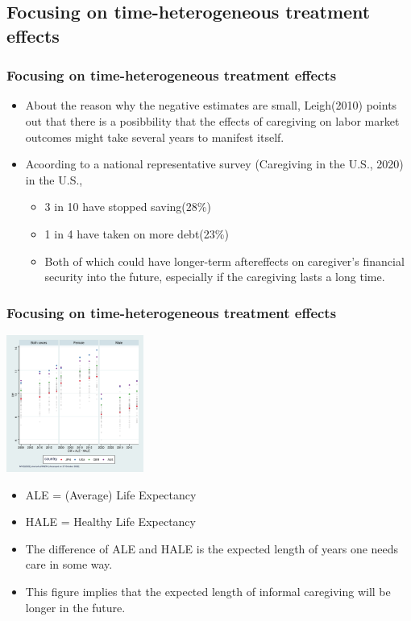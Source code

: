 \documentclass{beamer}
\begin{document}
    \subsection{Focusing on time-heterogeneous treatment effects}
        \begin{frame}\frametitle{Focusing on time-heterogeneous treatment effects}
            \begin{itemize}
                \item About the reason why the negative estimates are small, Leigh(2010) points out that there is a posibbility that the effects of caregiving on labor market outcomes might take several years to manifest itself.
                \item Acoording to a national representative survey (Caregiving in the U.S., 2020) in the U.S.,
                    \begin{itemize}
                        \item 3 in 10 have stopped saving(28\%)
                        \item 1 in 4 have taken on more debt(23\%)
                        \item Both of which could have longer-term aftereffects on caregiver's financial security into the future, especially if the caregiving lasts a long time.
                    \end{itemize}
            \end{itemize}
        \end{frame}
        \begin{frame}\frametitle{Focusing on time-heterogeneous treatment effects}
            \begin{center}
            \includegraphics[height = 4.5cm]{WHO_diff_expectancy.png}
            \end{center}
            \footnotesize
            \begin{itemize}
                \item ALE = (Average) Life Expectancy
                \item HALE = Healthy Life Expectancy
                \item The difference of ALE and HALE is the expected length of years one needs care in some way.
                \item This figure implies that the expected length of informal caregiving will be longer in the future.
            \end{itemize}
            \normalsize
        \end{frame}
\end{document}
